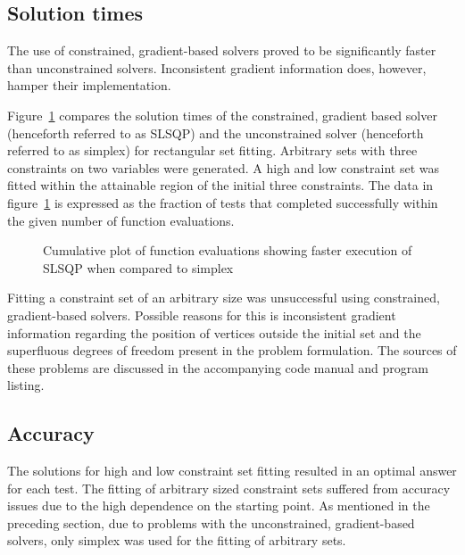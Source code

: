 \subsection{Solution times}
The use of constrained, gradient-based solvers proved to be significantly faster than unconstrained solvers.
Inconsistent gradient information does, however, hamper their implementation.

Figure~\ref{fig:cubefittime} compares the solution times of the constrained, gradient based solver (henceforth referred to as SLSQP) and the unconstrained solver (henceforth referred to as simplex) for rectangular set fitting.
Arbitrary sets with three constraints on two variables were generated.
A high and low constraint set was fitted within the attainable region of the initial three constraints.
The data in figure~\ref{fig:cubefittime} is expressed as the fraction of tests that completed successfully within the given number of function evaluations.

\begin{figure}[htbp]
  \centering
    \scalebox{1}{}  
  \caption[SLSQP and simplex calculation time comparison]{Cumulative plot of function evaluations showing faster execution of SLSQP when compared to simplex}
  \label{fig:cubefittime}
\end{figure}

Fitting a constraint set of an arbitrary size was unsuccessful using constrained, gradient-based solvers.
Possible reasons for this is inconsistent gradient information regarding the position of vertices outside the initial set and the superfluous degrees of freedom present in the problem formulation.
The sources of these problems are discussed in the accompanying code manual and program listing.

\subsection{Accuracy}\label{sec:fittingaccuracy}
The solutions for high and low constraint set fitting resulted in an optimal answer for each test.
The fitting of arbitrary sized constraint sets suffered from accuracy issues due to the high dependence on the starting point.
As mentioned in the preceding section, due to problems with the unconstrained, gradient-based solvers, only simplex was used for the fitting of arbitrary sets.

